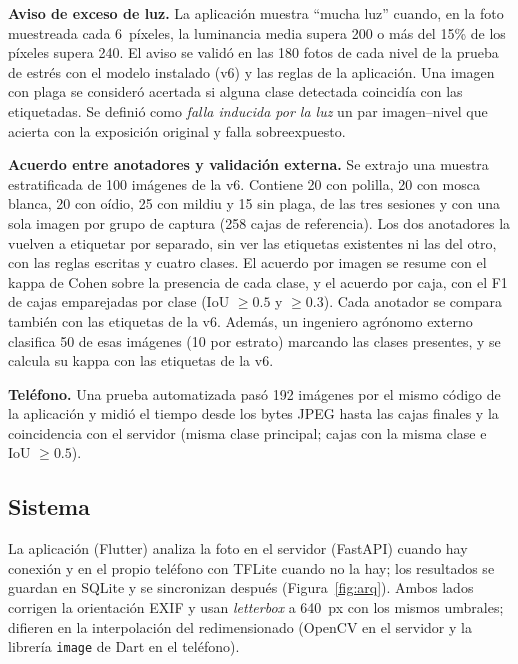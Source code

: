 \documentclass[sensors,article,submit,pdftex,moreauthors]{Definitions/mdpi}
\begin{document}
{\color{blue} \textbf{Aviso de exceso de luz.} La aplicación muestra ``mucha luz'' cuando, en la foto muestreada cada 6~píxeles, la luminancia media supera 200 o más del 15\% de los píxeles supera 240.} {\color{blue} El aviso se validó en las 180 fotos de cada nivel de la prueba de estrés con el modelo instalado (v6) y las reglas de la aplicación.} {\color{blue} Una imagen con plaga se consideró acertada si alguna clase detectada coincidía con las etiquetadas.} {\color{blue} Se definió como \emph{falla inducida por la luz} un par imagen--nivel que acierta con la exposición original y falla sobreexpuesto.}

{\color{blue} \textbf{Acuerdo entre anotadores y validación externa.}\label{sec:acuerdo} Se extrajo una muestra estratificada de 100 imágenes de la v6.} {\color{blue} Contiene 20 con polilla, 20 con mosca blanca, 20 con oídio, 25 con mildiu y 15 sin plaga, de las tres sesiones y con una sola imagen por grupo de captura (258 cajas de referencia).} {\color{blue} Los dos anotadores la vuelven a etiquetar por separado, sin ver las etiquetas existentes ni las del otro, con las reglas escritas y cuatro clases.} {\color{blue} El acuerdo por imagen se resume con el kappa de Cohen sobre la presencia de cada clase, y el acuerdo por caja, con el F1 de cajas emparejadas por clase (IoU $\geq 0.5$ y $\geq 0.3$).} {\color{blue} Cada anotador se compara también con las etiquetas de la v6.} {\color{blue} Además, un ingeniero agrónomo externo clasifica 50 de esas imágenes (10 por estrato) marcando las clases presentes, y se calcula su kappa con las etiquetas de la v6.}

{\color{blue} \textbf{Teléfono.} Una prueba automatizada pasó 192 imágenes por el mismo código de la aplicación y midió el tiempo desde los bytes JPEG hasta las cajas finales y la coincidencia con el servidor (misma clase principal; cajas con la misma clase e IoU $\geq 0.5$).}

\subsection{\color{blue} Sistema}

{\color{blue} La aplicación (Flutter) analiza la foto en el servidor (FastAPI) cuando hay conexión y en el propio teléfono con TFLite cuando no la hay; los resultados se guardan en SQLite y se sincronizan después (Figura~\ref{fig:arq}).} {\color{blue} Ambos lados corrigen la orientación EXIF y usan \emph{letterbox} a 640~px con los mismos umbrales; difieren en la interpolación del redimensionado (OpenCV en el servidor y la librería \texttt{image} de Dart en el teléfono).}
\end{document}
